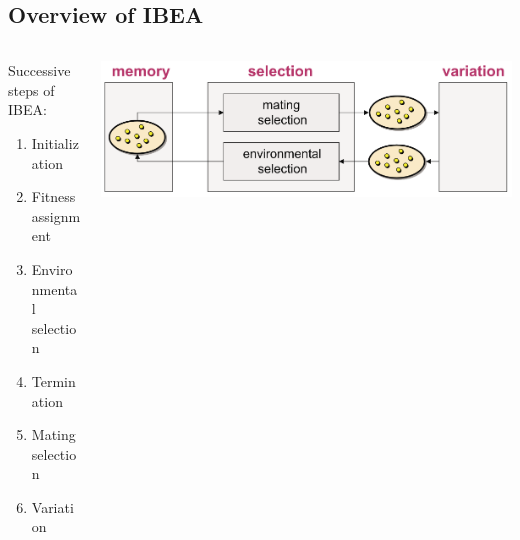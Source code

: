 \documentclass{beamer}
\begin{document}
\subsection{Overview of IBEA}
\begin{frame}
\begin{columns}[T]
\begin{column}{.48\textwidth}
Successive steps of IBEA:
\begin{enumerate}
\item Initialization
\item Fitness assignment %
\item Environmental selection %
\item Termination
\item Mating selection
\item Variation
\end{enumerate}
\end{column}
\begin{column}{.48\textwidth}
\includegraphics[scale=0.16]{stochasticSearchAlgorithm.png} \footnotemark
\end{column}
\end{columns}
\end{frame}
\end{document}
